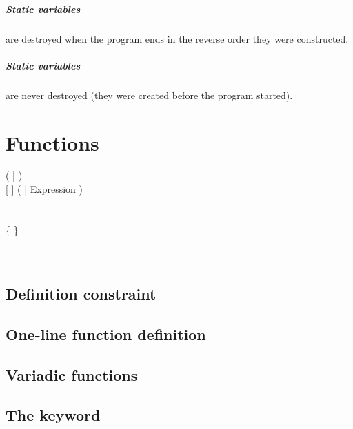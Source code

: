 \paragraph{Static variables} are destroyed when the program ends in the reverse order they were constructed.

\paragraph{Static  variables} are never destroyed (they were created before the program started).

\chapter{Functions}
\begin{grammar}
	    (  | \kwd{;} ) \\
	 [  ] (  | \kwd{=} Expression )\\
	  \kwd{(}  \kwd{)} \\
	\\
	 \kwd{\{} \{  \} \kwd{\}} \\
	  \\
		\grAltLn {} \kwd{;} \\
\end{grammar}

\section{Definition constraint}

\section{One-line function definition}

\section{Variadic functions}

\section{The  keyword}

